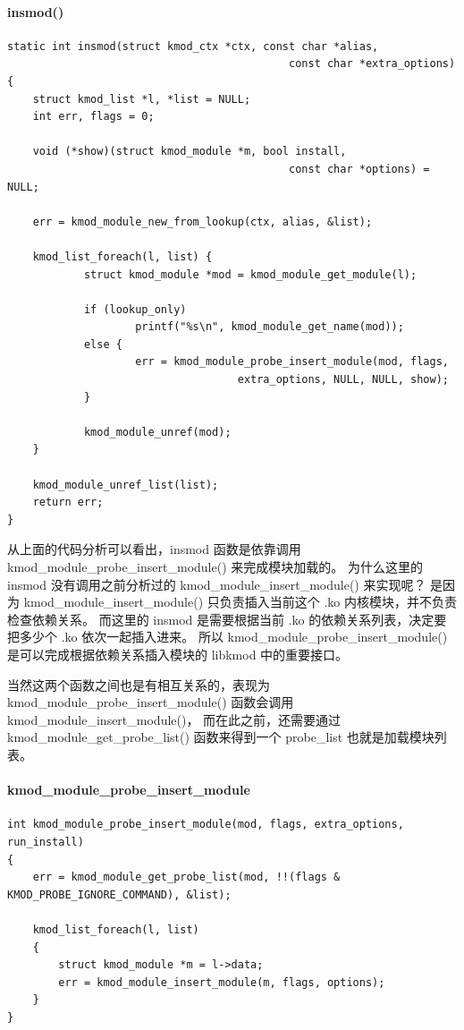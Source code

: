 \documentclass[11pt,a4paper]{article}
\begin{document}
\paragraph{insmod()}

{\begin{shaded}\begin{verbatim}
static int insmod(struct kmod_ctx *ctx, const char *alias,
                                            const char *extra_options)
{
    struct kmod_list *l, *list = NULL;
    int err, flags = 0;

    void (*show)(struct kmod_module *m, bool install,
                                            const char *options) = NULL;

    err = kmod_module_new_from_lookup(ctx, alias, &list);

    kmod_list_foreach(l, list) {
            struct kmod_module *mod = kmod_module_get_module(l);

            if (lookup_only)
                    printf("%s\n", kmod_module_get_name(mod));
            else {
                    err = kmod_module_probe_insert_module(mod, flags,
                                    extra_options, NULL, NULL, show);
            }

            kmod_module_unref(mod);
    }

    kmod_module_unref_list(list);
    return err;
}
\end{verbatim}\end{shaded}}
从上面的代码分析可以看出，insmod 函数是依靠调用
kmod\_module\_probe\_insert\_module() 来完成模块加载的。 为什么这里的
insmod 没有调用之前分析过的 kmod\_module\_insert\_module() 来实现呢？
是因为 kmod\_module\_insert\_module() 只负责插入当前这个 .ko
内核模块，并不负责检查依赖关系。 而这里的 insmod 是需要根据当前 .ko
的依赖关系列表，决定要把多少个 .ko 依次一起插入进来。 所以
kmod\_module\_probe\_insert\_module() 是可以完成根据依赖关系插入模块的
libkmod 中的重要接口。

当然这两个函数之间也是有相互关系的，表现为
kmod\_module\_probe\_insert\_module() 函数会调用
kmod\_module\_insert\_module()， 而在此之前，还需要通过
kmod\_module\_get\_probe\_list() 函数来得到一个 probe\_list
也就是加载模块列表。

\paragraph{kmod\_module\_probe\_insert\_module}

{\begin{shaded}\begin{verbatim}
int kmod_module_probe_insert_module(mod, flags, extra_options, run_install)
{
    err = kmod_module_get_probe_list(mod, !!(flags & KMOD_PROBE_IGNORE_COMMAND), &list);

    kmod_list_foreach(l, list) 
    {
        struct kmod_module *m = l->data;
        err = kmod_module_insert_module(m, flags, options);
    }
}
\end{verbatim}\end{shaded}}
\end{document}
